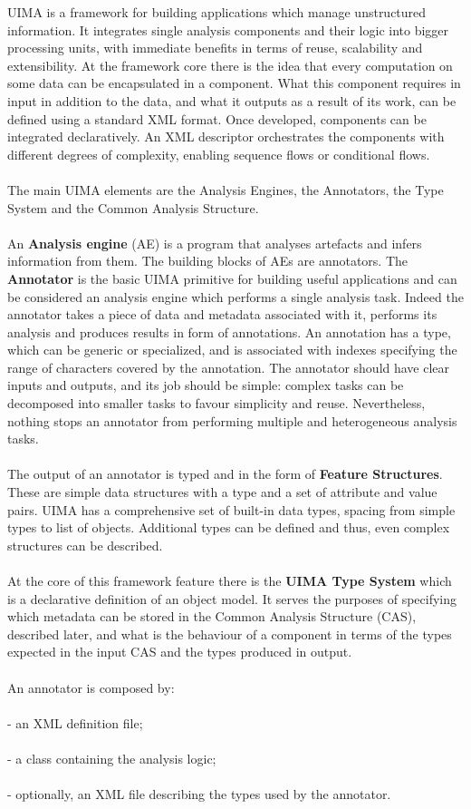 \documentclass{wileysev}
\begin{document}
UIMA is a framework for building applications which manage unstructured information. It integrates single analysis components and their logic into bigger processing units, with immediate benefits in terms of reuse, scalability and extensibility. At the framework core there is the idea that every computation on some data can be encapsulated in a component. What this component requires in input in addition to the data, and what it outputs as a result of its work, can be defined using a standard XML format. Once developed, components can be integrated declaratively. An XML descriptor orchestrates the components with different degrees of complexity, enabling sequence flows or conditional flows.\\\\
The main UIMA elements are the Analysis Engines, the Annotators, the Type System and the Common Analysis Structure.\\\\
An \textbf{Analysis engine} (AE) is a program that analyses artefacts and infers information from them. The building blocks of AEs are annotators. The \textbf{Annotator} is the basic UIMA primitive for building useful applications and can be considered an analysis engine which performs a single analysis task. Indeed the annotator takes a piece of data and metadata associated with it, performs its analysis and produces results in form of annotations. An annotation has a type, which can be generic or specialized, and is associated with indexes specifying the range of characters covered by the annotation. The annotator should have clear inputs and outputs, and its job should be simple: complex tasks can be decomposed into smaller tasks to favour simplicity and reuse. Nevertheless, nothing stops an annotator from performing multiple and heterogeneous analysis tasks.\\\\
The output of an annotator is typed and in the form of \textbf{Feature Structures}. These are simple data structures with a type and a set of attribute and value pairs. UIMA has a comprehensive set of built-in data types, spacing from simple types to list of objects. Additional types can be defined and thus, even complex structures can be described.\\\\
At the core of this framework feature there is the \textbf{UIMA Type System} which is a declarative definition of an object model. It serves the purposes of specifying which metadata can be stored in the Common Analysis Structure (CAS), described later, and what is the behaviour of a component in terms of the types expected in the input CAS and the types produced in output.\\\\
An annotator is composed by:
\\\\
- an XML definition file;
\\\\
- a class containing the analysis logic;
\\\\
- optionally, an XML file describing the types used by the annotator.
\\\\
\end{document}
